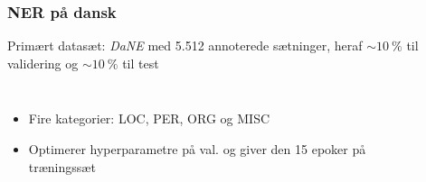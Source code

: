 \documentclass{beamer}
\newcommand{\unit}[1]{\ensuremath{\:\text{#1}}}
\newcommand{\pro}{\ensuremath{\unit{\%{}}}}
\begin{document}
\begin{frame}
    \frametitle{NER på dansk}
    Primært datasæt: \emph{DaNE} med 5.512 annoterede sætninger, heraf $ \sim 10\pro $ til validering og $ \sim 10\pro $ til test
    \begin{columns}
        \begin{itemize}
            \item Fire kategorier: LOC, PER, ORG og MISC
            \item Optimerer hyperparametre på val. og giver den 15 epoker på træningssæt
        \end{itemize}
        \begin{figure}[H]
            \centering
            \begin{overlayarea}{\textwidth}{4cm}
            \end{overlayarea}
        \end{figure}
    \end{columns}
\end{frame}
\end{document}
